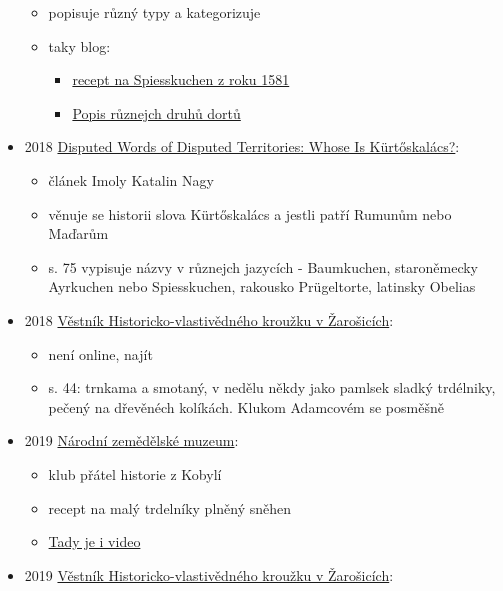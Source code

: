 \begin{itemize}
  \begin{itemize}
  \tightlist
  \item
    popisuje různý typy a kategorizuje
  \item
    taky blog:

    \begin{itemize}
    \tightlist
    \item
      \href{https://diybaumkuchen.blogspot.com/2015/06/1581-82-was-boom-year-for-cake.html}{recept
      na Spiesskuchen z roku 1581}
    \item
      \href{https://diybaumkuchen.blogspot.com/2015/08/the-family-tree.html}{Popis
      různejch druhů dortů}
    \end{itemize}
  \end{itemize}
\item
  2018 \href{https://www.ceeol.com/search/viewpdf?id=756237}{Disputed
  Words of Disputed Territories: Whose Is Kürtőskalács?}:

  \begin{itemize}
  \tightlist
  \item
    článek Imoly Katalin Nagy
  \item
    věnuje se historii slova Kürtőskalács a jestli patří Rumunům nebo
    Maďarům
  \item
    s. 75 vypisuje názvy v různejch jazycích - Baumkuchen, staroněmecky
    Ayrkuchen nebo Spiesskuchen, rakousko Prügeltorte, latinsky Obelias
  \end{itemize}
\item
  2018
  \href{https://ceskadigitalniknihovna.cz/uuid/uuid:3f2c7e80-38fe-11e9-b81e-005056827e52}{Věstník
  Historicko-vlastivědného kroužku v Žarošicích}:

  \begin{itemize}
  \tightlist
  \item
    není online, najít
  \item
    s. 44: trnkama a smotaný, v nedělu někdy jako pamlsek sladký
    trdélniky, pečený na dřevěnéch kolíkách. Klukom Adamcovém se
    posměšně
  \end{itemize}
\item
  2019
  \href{https://www.nzm.cz/o-nas/aktuality/teticky-z-kobyli}{Národní
  zemědělské muzeum}:

  \begin{itemize}
  \tightlist
  \item
    klub přátel historie z Kobylí
  \item
    recept na malý trdelníky plněný sněhen
  \item
    \href{https://www.ceskatelevize.cz/porady/13889655314-peceni-na-nedeli/13478-recepty/12089-trdelnicky-z-kobyli/}{Tady
    je i video}
  \end{itemize}
\item
  2019
  \href{https://ceskadigitalniknihovna.cz/uuid/uuid:771c80e0-53ee-11ea-a3ba-005056827e52}{Věstník
  Historicko-vlastivědného kroužku v Žarošicích}:


\end{itemize}
